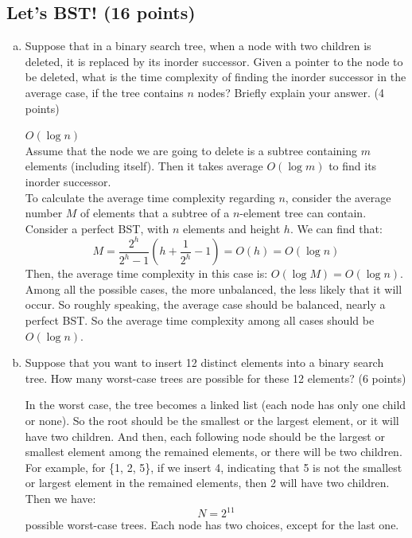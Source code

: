 \documentclass[11pt]{exam}
\begin{document}
\subsection{Let's BST! (16 points)}
\begin{enumerate}[a)]
\item Suppose that in a binary search tree, when a node with two children is deleted, it is replaced by its inorder successor. Given a pointer to the node to be deleted, what is the time complexity of finding the inorder successor in the average case, if the tree contains $n$ nodes? Briefly explain your answer. (4 points)
\begin{solution}
\par
$O(\log n)$ \\
Assume that the node we are going to delete is a subtree containing $m$ elements (including itself). Then it takes average $O(\log m)$ to find its inorder successor. \\
To calculate the average time complexity regarding $n$, consider the average number $M$ of elements that a subtree of a $n$-element tree can contain. \\
Consider a perfect BST, with $n$ elements and height $h$. We can find that:
 $$M=\frac{2^{h}}{2^{h}-1}(h+\frac{1}{2^{h}}-1)=O(h)=O(\log n)$$
Then, the average time complexity in this case is: $O(\log M)=O(\log n)$. \\
Among all the possible cases, the more unbalanced, the less likely that it will occur. So roughly speaking, the average case should be balanced, nearly a perfect BST. So the average time complexity among all cases should be $O(\log n)$.
\end{solution}

\item
Suppose that you want to insert 12 distinct elements into a binary search tree. How many worst-case trees are possible for these 12 elements? (6 points)
\begin{solution}
\par
In the worst case, the tree becomes a linked list (each node has only one child or none). So the root should be the smallest or the largest element, or it will have two children. And then, each following node should be the largest or smallest element among the remained elements, or there will be two children. For example, for \{1, 2, 5\}, if we insert 4, indicating that 5 is not the smallest or largest element in the remained elements, then 2 will have two children. \\
Then we have:
$$N = 2^{11}$$
possible worst-case trees. Each node has two choices, except for the last one.
\end{solution}


\end{enumerate}
\end{document}
